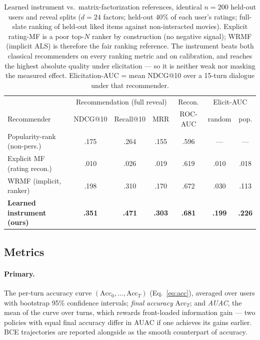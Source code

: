 \documentclass[11pt]{article}
\begin{document}
\begin{table}[t]
\centering
\caption{Learned instrument vs.\ matrix-factorization references, identical
$n{=}200$ held-out users and reveal splits ($d{=}24$ factors; held-out 40\%
of each user's ratings; full-slate ranking of held-out liked items against
non-interacted movies). Explicit rating-MF is a poor top-$N$ ranker by
construction (no negative signal); WRMF (implicit ALS) is therefore the fair
ranking reference. The instrument beats both classical recommenders on every
ranking metric and on calibration, and reaches the highest absolute quality
under elicitation --- so it is neither weak nor masking the measured effect.
Elicitation-AUC = mean NDCG@10 over a 15-turn dialogue under that recommender.}
\label{tab:mf_reference}
\small
\begin{tabular}{lcccc cc}
\toprule
 & \multicolumn{3}{c}{Recommendation (full reveal)} & Recon. & \multicolumn{2}{c}{Elicit-AUC} \\
Recommender & NDCG@10 & Recall@10 & MRR & ROC-AUC & random & pop. \\
\midrule
Popularity-rank (non-pers.) & .175 & .264 & .155 & .596 & --- & --- \\
Explicit MF (rating recon.) & .010 & .026 & .019 & .619 & .010 & .018 \\
WRMF (implicit, ranker)     & .198 & .310 & .170 & .672 & .030 & .113 \\
\textbf{Learned instrument (ours)} & \textbf{.351} & \textbf{.471} & \textbf{.303} & \textbf{.681} & \textbf{.199} & \textbf{.226} \\
\bottomrule
\end{tabular}
\end{table}

\subsection{Metrics}
\label{sec:metrics}

\paragraph{Primary.} The per-turn accuracy curve
$(\mathrm{Acc}_0, \ldots, \mathrm{Acc}_T)$ (Eq.~\ref{eq:acc}), averaged
over users with bootstrap 95\% confidence intervals; \emph{final accuracy}
$\mathrm{Acc}_T$; and \emph{AUAC}, the mean of the curve over turns, which
rewards front-loaded information gain --- two policies with equal final
accuracy differ in AUAC if one achieves its gains earlier. BCE
trajectories are reported alongside as the smooth counterpart of accuracy.
\end{document}

